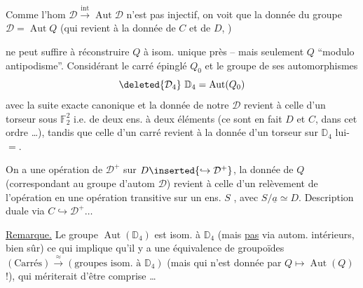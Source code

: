 Comme l'hom $\mathcal D\xrightarrow{\mathrm{int}}\operatorname{Aut}\mathcal D$ n'est pas injectif, on voit que la donnée du  groupe $\mathcal D=\operatorname{Aut}Q$ (qui revient à la donnée de $C$ et de $D$, ) 



ne peut suffire à réconstruire $Q$ à isom. unique près -- mais seulement $Q$ ``modulo antipodisme''. Considérant le carré épinglé $Q_0$ et le groupe de ses automorphismes
\[
\deleted{\mathcal D_4}\ \mathbb D_4=\operatorname{Aut}(Q_0)
\]
avec la suite exacte canonique
et la donnée de notre $\mathcal D$ revient à celle d'un torseur sous  $\mathbb F_2^2$  i.e. de deux ens. à deux éléments (ce sont en fait $D$ et $C$, dans cet ordre \ldots), tandis que celle d'un carré revient à la donnée d'un torseur sur $\mathbb D_4$ lui-$=$.

On a une opération  de $\mathcal D^+$ sur $D\inserted{\hookrightarrow\mathcal D^+}$, la donnée de $Q$ (correspondant au groupe d'autom $\mathcal D$)  revient à celle d'un relèvement de   l'opération  en  une opération  transitive sur un ens. $S$ , avec $S/\underline a\simeq D$. Description duale via $C\hookrightarrow\mathcal D^+\ldots$

\uline{Remarque.} Le groupe $\operatorname{Aut}(\mathbb D_4)$ est isom. à $\mathbb D_4$ (mais \uline{pas} via autom. intérieurs, bien sûr) ce qui implique qu'il y a  une équivalence de groupoïdes $(\text{Carrés})\xrightarrow{\approx}(\text{groupes isom. à }\mathbb D_4)$ (mais qui n'est  donnée par  $Q\mapsto\operatorname{Aut}(Q)$ !), qui mériterait d'être comprise \ldots



